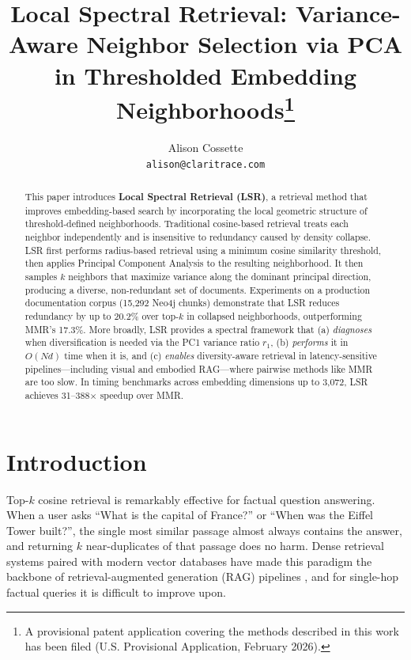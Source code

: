 \documentclass{article}
\title{Local Spectral Retrieval: Variance-Aware Neighbor Selection via PCA in Thresholded Embedding Neighborhoods\thanks{A provisional patent application covering the methods described in this work has been filed (U.S. Provisional Application, February 2026).}}
\author{
  Alison Cossette \\
  \texttt{alison@claritrace.com}
}
\begin{document}
\maketitle

\begin{abstract}
This paper introduces \textbf{Local Spectral Retrieval (LSR)}, a retrieval method that improves embedding-based search by incorporating the local geometric structure of threshold-defined neighborhoods. Traditional cosine-based retrieval treats each neighbor independently and is insensitive to redundancy caused by density collapse. LSR first performs radius-based retrieval using a minimum cosine similarity threshold, then applies Principal Component Analysis to the resulting neighborhood. It then samples $k$ neighbors that maximize variance along the dominant principal direction, producing a diverse, non-redundant set of documents. Experiments on a production documentation corpus (15,292 Neo4j chunks) demonstrate that LSR reduces redundancy by up to 20.2\% over top-$k$ in collapsed neighborhoods, outperforming MMR's 17.3\%. More broadly, LSR provides a spectral framework that (a) \emph{diagnoses} when diversification is needed via the PC1 variance ratio $r_1$, (b) \emph{performs} it in $O(Nd)$ time when it is, and (c) \emph{enables} diversity-aware retrieval in latency-sensitive pipelines---including visual and embodied RAG---where pairwise methods like MMR are too slow. In timing benchmarks across embedding dimensions up to 3,072, LSR achieves 31--388$\times$ speedup over MMR.
\end{abstract}


\section{Introduction}

Top-$k$ cosine retrieval is remarkably effective for factual question answering. When a user asks ``What is the capital of France?'' or ``When was the Eiffel Tower built?'', the single most similar passage almost always contains the answer, and returning $k$ near-duplicates of that passage does no harm. Dense retrieval systems \cite{karpukhin2020dense} paired with modern vector databases \cite{johnson2019billion} have made this paradigm the backbone of retrieval-augmented generation (RAG) pipelines \cite{lewis2020rag}, and for single-hop factual queries it is difficult to improve upon.
\end{document}
